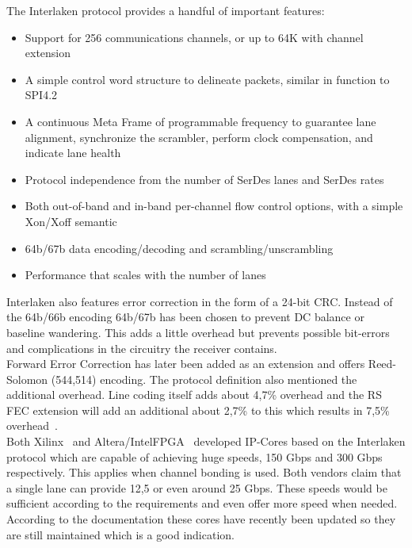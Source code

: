 	The Interlaken protocol provides a handful of important features:\cite{InterlakenProtocol}
	\begin{itemize}
		\item Support for 256 communications channels, or up to 64K with channel extension 
		\item A simple control word structure to delineate packets, similar in function to SPI4.2~\cite{SPI4.2}
		\item A continuous Meta Frame of programmable frequency to guarantee lane alignment, 
		synchronize the scrambler, perform clock compensation, and indicate lane health
		\item Protocol independence from the number of SerDes lanes and SerDes rates
		\item Both out-of-band and in-band per-channel flow control options, with a simple Xon/Xoff semantic
		\item 64b/67b data encoding/decoding and scrambling/unscrambling
		\item Performance that scales with the number of lanes \newline
	\end{itemize}
	
	Interlaken also features error correction in the form of a 24-bit CRC.
	Instead of the 64b/66b encoding 64b/67b has been chosen to prevent DC balance or baseline wandering. This adds a little overhead but prevents possible bit-errors and complications in the circuitry the receiver contains.\\
	Forward Error Correction has later been added as an extension and offers Reed-Solomon (544,514) encoding. The protocol definition also mentioned the additional overhead. Line coding itself adds about 4,7\% overhead and the RS FEC extension will add an additional about 2,7\% to this which results in 7,5\% overhead~\cite{InterlakenRS}.\\
	
	Both Xilinx~\cite{XilinxInterlaken} and Altera/IntelFPGA~\cite{AlteraInterlaken} developed IP-Cores based on the Interlaken protocol which are capable of achieving huge speeds, 150 Gbps and 300 Gbps respectively. This applies when channel bonding is used. Both vendors claim that a single lane can provide 12,5 or even around 25 Gbps. These speeds would be sufficient according to the requirements and even offer more speed when needed. According to the documentation these cores have recently been updated so they are still maintained which is a good indication.\\


